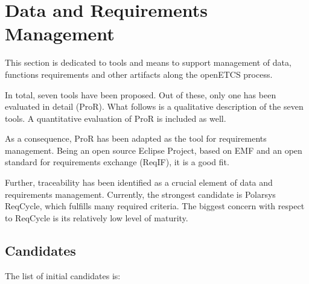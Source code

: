 

\chapter{Data and Requirements Management}
\label{sec:management}

 
This section is dedicated to tools and means to support management of data, functions requirements and other artifacts along  the openETCS process.

In total, seven tools have been proposed.  Out of these, only one has been evaluated in detail (ProR).  What follows is a qualitative description of the seven tools.  A quantitative evaluation of ProR is included as well.

As a consequence, ProR has been adapted as the tool for requirements management.  Being an open source Eclipse Project, based on EMF and an open standard for requirements exchange (ReqIF), it is a good fit.

Further, traceability has been identified as a crucial element of data and requirements management.  Currently, the strongest candidate is Polarsys ReqCycle, which fulfills many required criteria.  The biggest concern with respect to ReqCycle is its relatively low level of maturity.

\section{Candidates}
The list of initial candidates is:

